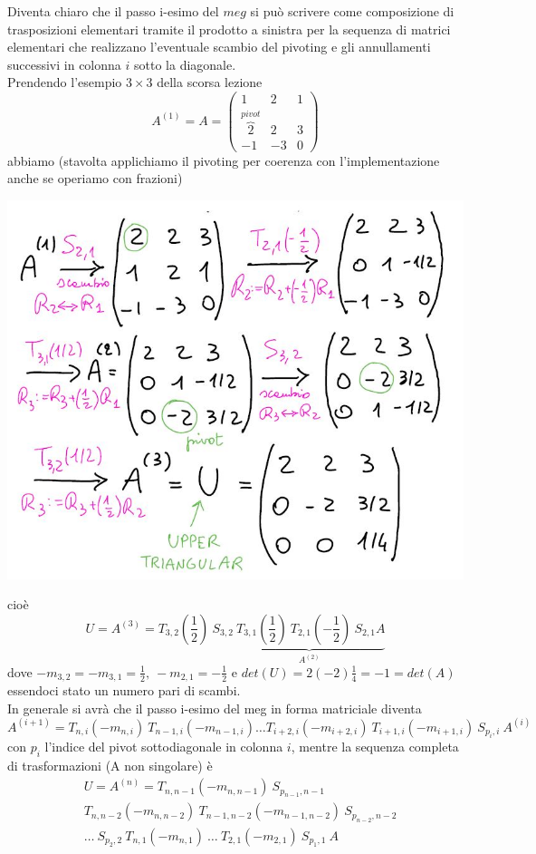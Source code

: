 Diventa chiaro che il passo i-esimo del $meg$ si può scrivere come composizione di trasposizioni elementari tramite il prodotto a sinistra per la sequenza di matrici elementari che realizzano l'eventuale scambio del pivoting e gli annullamenti successivi in colonna $i$ sotto la diagonale.\\Prendendo l'esempio $3\times 3$ della scorsa lezione
\begin{equation*}
    A^{(1)}=A=\begin{pmatrix}
        1 & 2 & 1 \\
        \overbrace{2}^{pivot} & 2 & 3 \\
        -1 & -3 & 0
        \end{pmatrix}
\end{equation*}
abbiamo (stavolta applichiamo il pivoting per coerenza con l'implementazione anche se operiamo con frazioni)
\begin{center}
    \includegraphics[scale=0.5]{foto/calcolo1_2.JPG}    
\end{center}
cioè
\[
U = A^{(3)} = T_{3,2} (\frac{1}{2}) \ S_{3,2} \underbrace{\ T_{3,1} (\frac{1}{2}) \ T_{2,1} (-\frac{1}{2}) \ S_{2,1} A}_{A^{(2)}}
\]
dove $-m_{3,2} = -m_{3,1} = \frac{1}{2}, \ -m_{2,1} = -\frac{1}{2}$ e $det(U) = 2(-2)\frac{1}{4} = -1 = det(A)$ essendoci stato un numero pari di scambi.\\
In generale si avrà che il passo i-esimo del meg in forma matriciale diventa
\[
    A^{(i+1)} = T_{n,i} (-m_{n, i}) \ T_{n-1, i} (-m_{n-1, i}) \dotso T_{i+2, i} (-m_{i+2, i})\ T_{i+1, i} (-m_{i+1, i}) \ S_{p_i, i} \ A^{(i)}
\]
con $p_i$ l'indice del pivot sottodiagonale in colonna $i$, mentre la sequenza completa di trasformazioni (A non singolare) è
\[
\begin{split}
    & U = A^{(n)} = T_{n, n-1} (-m_{n, n-1}) \ S_{p_{n-1}, n-1} \\
    & T_{n, n-2} (-m_{n, n-2}) \ T_{n-1, n-2} (-m_{n-1, n-2}) \ S_{p_{n-2}, n-2} \\
    & \dotso \ S_{p_2, 2} \ T_{n,1} (-m_{n,1}) \ \dotso \ T_{2,1} (-m_{2,1}) \ S_{p_1, 1} \ A
\end{split}
\]

